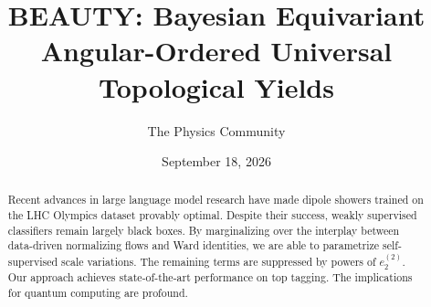 \documentclass[11pt]{article}
\title{BEAUTY: Bayesian Equivariant Angular-Ordered Universal Topological Yields}
\author{The Physics Community}
\date{September 18, 2026}
\begin{document}
\maketitle
\begin{abstract}
Recent advances in large language model research have made dipole
showers trained on the LHC Olympics dataset provably optimal. Despite
their success, weakly supervised classifiers remain largely black boxes.
By marginalizing over the interplay between data-driven normalizing
flows and Ward identities, we are able to parametrize self-supervised
scale variations. The remaining terms are suppressed by powers of
$e_2^{(2)}$. Our approach achieves state-of-the-art performance on top
tagging. The implications for quantum computing are profound.
\end{abstract}
\tableofcontents



\nocite{*}


\end{document}
